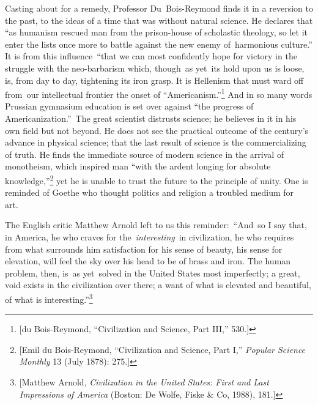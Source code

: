 \documentclass[twoside,symmetric,nobib,justified]{tufte-book}
\begin{document}
Casting about for a remedy, Professor Du~Bois-Reymond finds it in a
reversion to the past, to the ideas of a time that was without natural
science. He declares that ``as humanism rescued man from the
prison-house of scholastic theology, so let it enter the lists once more
to battle against the new enemy of~harmonious culture.'' It is from this
influence~``that we can most confidently hope for victory in the
struggle with the neo-barbarism which, though~as yet~its hold upon us is
loose, is, from day to day, tightening its iron grasp. It is Hellenism
that must ward off from~our intellectual frontier the onset of
``Americanism.''\footnote{{[}du Bois-Reymond, ``Civilization and
  Science, Part III,'' 530.{]}} And in so many words Prussian gymnasium
education is set over against ``the progress of Americanization.''~The
great scientist distrusts science; he believes in it in his own field
but not beyond. He does not see the practical outcome of the century's
advance in physical science; that the last result of science is the
commercializing of truth. He finds the immediate source of modern
science in the arrival of monotheism, which inspired man ``with the
ardent longing for absolute knowledge,''\footnote{{[}Emil du
  Bois-Reymond, ``Civilization and Science, Part I,'' \emph{Popular
  Science Monthly} 13 (July 1878): 275.{]}} yet he is unable to trust
the future to the principle of unity. One is reminded of Goethe who
thought politics and religion a troubled medium for art.~

The English critic Matthew Arnold left to us this reminder:~``And~so I
say that, in America, he who craves for the\emph{~interesting}~in
civilization, he who requires from what surrounds him satisfaction for
his sense of beauty, his sense for elevation, will feel the sky over his
head to be of brass and iron. The human problem, then, is~as yet~solved
in the United States most imperfectly; a great, void exists in the
civilization over there; a want of what is elevated and beautiful, of
what is interesting.''\footnote{{[}Matthew Arnold, \emph{Civilization in
  the United States: First and Last Impressions of America} (Boston: De
  Wolfe, Fiske \& Co, 1988), 181.{]}}~
\end{document}
